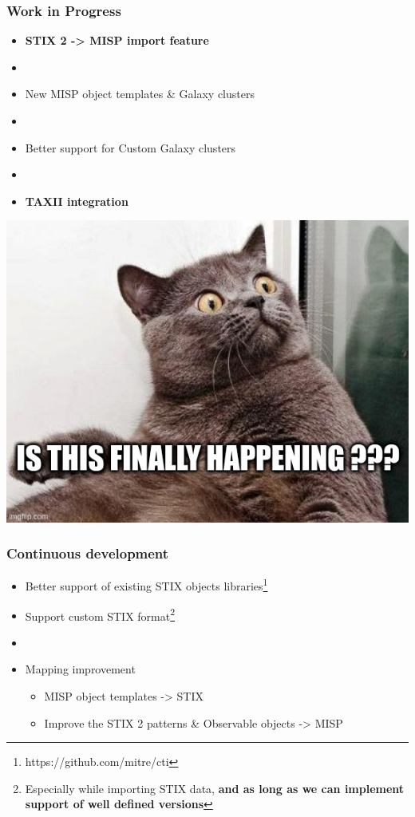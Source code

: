 \begin{frame}
    \frametitle{Work in Progress}
    \begin{itemize}
        \item {\bf STIX 2 -> MISP import feature}
        \item []
        \item New MISP object templates \& Galaxy clusters
        \item []
        \item Better support for Custom Galaxy clusters
        \item []
    \end{itemize}
    \pause
    \begin{minipage}{0.5\textwidth}
        \begin{itemize}
            \item {\bf TAXII integration}
        \end{itemize}
    \end{minipage}%
    \begin{minipage}{0.5\textwidth}
        \includegraphics[scale=0.2]{images/surprise.jpg}
    \end{minipage}
\end{frame}

\begin{frame}
    \frametitle{Continuous development}
    \begin{itemize}
        \item Better support of existing STIX objects libraries\footnote{https://github.com/mitre/cti}
        \item Support custom STIX format\footnote{Especially while importing STIX data, {\bf and as long as we can implement support of well defined versions}}
        \item []
        \item Mapping improvement
        \begin{itemize}
            \item MISP object templates -> STIX
            \item Improve the STIX 2 patterns \& Observable objects -> MISP
        \end{itemize}
    \end{itemize}
\end{frame}

